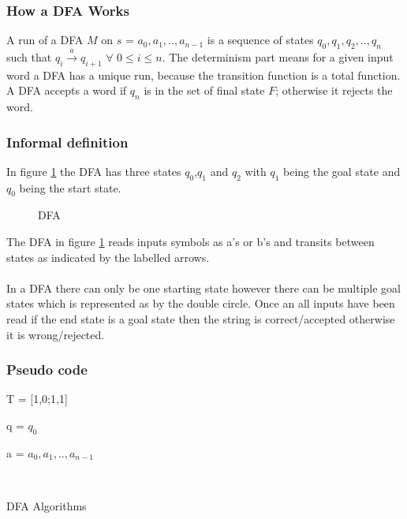 \subsubsection{How a DFA Works}
A run of a DFA $M$ on $s$ = $a_0,a_1,..,a_{n-1}$ is a sequence of states $q_0,q_1,q_2,..,q_n$ such that $q_i \xrightarrow{a}q_{i+1}\,\, \forall \,\, 0\leq i \le n$. The determinism part means for a given input word a DFA has a unique run, because the transition function is a total function. A DFA accepts a word if $q_n$ is in the set of final state $F$; otherwise it rejects the word.
\subsubsection{Informal definition}
In figure \ref{fig:DFSA} the DFA has three states $q_0$,$q_1$ and $q_2$ with $q_1$ being the goal state and $q_0$ being the start state.
\begin{figure}[H]
    \centering
    \caption{DFA}
    \label{fig:DFSA}
\end{figure}
The DFA in figure \ref{fig:DFSA} reads inputs symbols as a's or b's and transits between states as indicated by the labelled arrows. 
\\\\
In a DFA there can only be one starting state however there can be multiple goal states which is represented as by the double circle. Once an all inputs have been read if the end state is a goal state then the string is correct/accepted otherwise it is wrong/rejected. 
\subsubsection{Pseudo code}
\begin{algorithm}[H]
\SetAlgoLined
{}
 T = [1,0;1,1]\;
 
 q = $q_0$\;
 
 a = $a_0,a_1,..,a_{n-1}$\;
 
 \\
 \caption{DFA Algorithms}
\end{algorithm}
